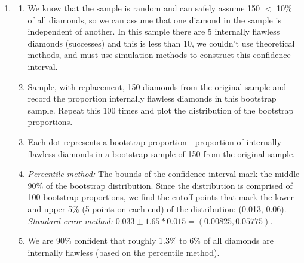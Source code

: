 \documentclass[11pt]{article}
\begin{document}
\begin{enumerate}

\item
\begin{enumerate}
\item We know that the sample is random and can safely assume 150 $<$ 10\% of all diamonds, so we can assume that one diamond in the sample is independent of another. In this sample there are 5 internally flawless diamonds (successes) and this is less than 10, we couldn't use theoretical methods, and must use simulation methods to construct this confidence interval.

\item Sample, with replacement, 150 diamonds from the original sample and record the proportion internally flawless diamonds in this bootstrap sample. Repeat this 100 times and plot the distribution of the bootstrap proportions. 

\item Each dot represents a bootstrap proportion - proportion of internally flawless diamonds in a bootstrap sample of 150 from the original sample. 

\item \textit{Percentile method:} The bounds of the confidence interval mark the middle 90\% of the bootstrap distribution. Since the distribution is comprised of 100 bootstrap proportions, we find the cutoff points that mark the lower and upper 5\% (5 points on each end) of the distribution: (0.013, 0.06). \\
\textit{Standard error method:} $0.033 \pm 1.65 * 0.015 =  (0.00825, 0.05775)$.

\item We are 90\% confident that roughly 1.3\% to 6\% of all diamonds are internally flawless (based on the percentile method).
\end{enumerate}

%


\end{enumerate}
\end{document}
